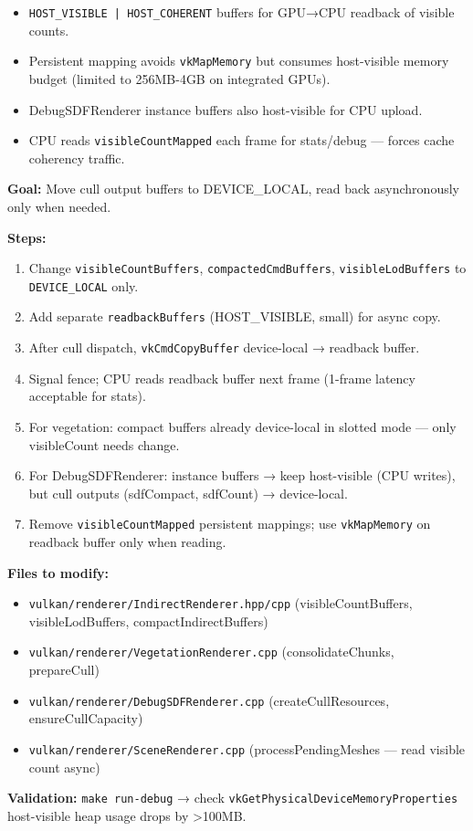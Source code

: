 \documentclass[11pt,a4paper]{article}
\begin{document}
\begin{itemize}
    \item \texttt{HOST\_VISIBLE | HOST\_COHERENT} buffers for GPU→CPU readback of visible counts.
    \item Persistent mapping avoids \texttt{vkMapMemory} but consumes host-visible memory budget (limited to 256MB-4GB on integrated GPUs).
    \item DebugSDFRenderer instance buffers also host-visible for CPU upload.
    \item CPU reads \texttt{visibleCountMapped} each frame for stats/debug — forces cache coherency traffic.
\end{itemize}

\begin{tcolorbox}[promptbox={Prompt: Device-Local Cull Outputs + Async Readback}]
\textbf{Goal:} Move cull output buffers to DEVICE\_LOCAL, read back asynchronously only when needed.

\textbf{Steps:}
\begin{enumerate}
    \item Change \texttt{visibleCountBuffers}, \texttt{compactedCmdBuffers}, \texttt{visibleLodBuffers} to \texttt{DEVICE\_LOCAL} only.
    \item Add separate \texttt{readbackBuffers} (HOST\_VISIBLE, small) for async copy.
    \item After cull dispatch, \texttt{vkCmdCopyBuffer} device-local → readback buffer.
    \item Signal fence; CPU reads readback buffer next frame (1-frame latency acceptable for stats).
    \item For vegetation: compact buffers already device-local in slotted mode — only visibleCount needs change.
    \item For DebugSDFRenderer: instance buffers → keep host-visible (CPU writes), but cull outputs (sdfCompact, sdfCount) → device-local.
    \item Remove \texttt{visibleCountMapped} persistent mappings; use \texttt{vkMapMemory} on readback buffer only when reading.
\end{enumerate}

\textbf{Files to modify:}
\begin{itemize}
    \item \texttt{vulkan/renderer/IndirectRenderer.hpp/cpp} (visibleCountBuffers, visibleLodBuffers, compactIndirectBuffers)
    \item \texttt{vulkan/renderer/VegetationRenderer.cpp} (consolidateChunks, prepareCull)
    \item \texttt{vulkan/renderer/DebugSDFRenderer.cpp} (createCullResources, ensureCullCapacity)
    \item \texttt{vulkan/renderer/SceneRenderer.cpp} (processPendingMeshes — read visible count async)
\end{itemize}

\textbf{Validation:} \texttt{make run-debug} → check \texttt{vkGetPhysicalDeviceMemoryProperties} host-visible heap usage drops by >100MB.
\end{tcolorbox}
\end{document}
